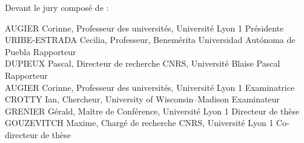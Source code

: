 	{\fontsize{12pt}{14pt}\selectfont
	Devant le jury composé de :\\}
	{\fontsize{11pt}{13pt}\selectfont

	AUGIER Corinne, Professeur des universités, Université Lyon 1 \hfill Présidente\\ %

	URIBE-ESTRADA Cecilia, Professeur, Benemérita Universidad Autónoma de Puebla \hfill Rapporteur\\
	DUPIEUX Pascal, Directeur de recherche CNRS, Université Blaise Pascal \hfill Rapporteur\\
	AUGIER Corinne, Professeur des universités, Université Lyon 1 \hfill Examinatrice\\
	CROTTY Ian, Chercheur, University of Wisconsin–Madison \hfill Examinateur\\
	
	GRENIER Gérald, Maître de Conférence, Université Lyon 1 \hfill Directeur de thèse\\
	GOUZEVITCH Maxime, Chargé de recherche CNRS, Université Lyon 1 \hfill Co-directeur de thèse\\}
	\cleardoublepage
	\restoregeometry